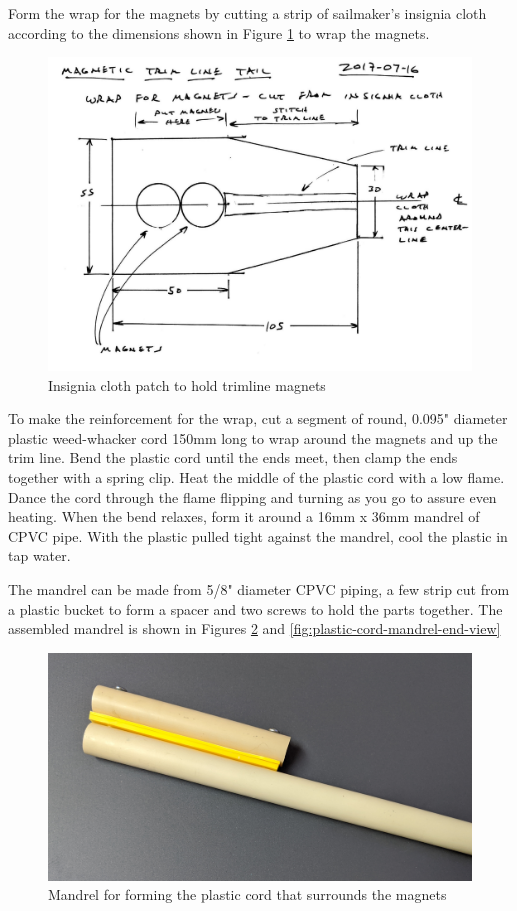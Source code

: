 \documentclass[
]{book}
\begin{document}
Form the wrap for the magnets by cutting a strip of sailmaker's insignia cloth according to the dimensions shown in Figure \ref{fig:magnet-wrap} to wrap the magnets.

\begin{figure}

{\centering \includegraphics[width=0.7\linewidth]{images/magnetic_trimline_tails_9} 

}

\caption{Insignia cloth patch to hold trimline magnets}\label{fig:magnet-wrap}
\end{figure}

To make the reinforcement for the wrap, cut a segment of round, 0.095" diameter plastic weed-whacker cord 150mm long to wrap around the magnets and up the trim line. Bend the plastic cord until the ends meet, then clamp the ends together with a spring clip. Heat the middle of the plastic cord with a low flame. Dance the cord through the flame flipping and turning as you go to assure even heating. When the bend relaxes, form it around a 16mm x 36mm mandrel of CPVC pipe. With the plastic pulled tight against the mandrel, cool the plastic in tap water.

The mandrel can be made from 5/8" diameter CPVC piping, a few strip cut from a plastic bucket to form a spacer and two screws to hold the parts together. The assembled mandrel is shown in Figures \ref{fig:plastic-cord-mandrel} and \ref{fig:plastic-cord-mandrel-end-view}

\begin{figure}

{\centering \includegraphics[width=0.7\linewidth]{images/plastic_cord_mandrel} 

}

\caption{Mandrel for forming the plastic cord that surrounds the magnets}\label{fig:plastic-cord-mandrel}
\end{figure}
\end{document}
